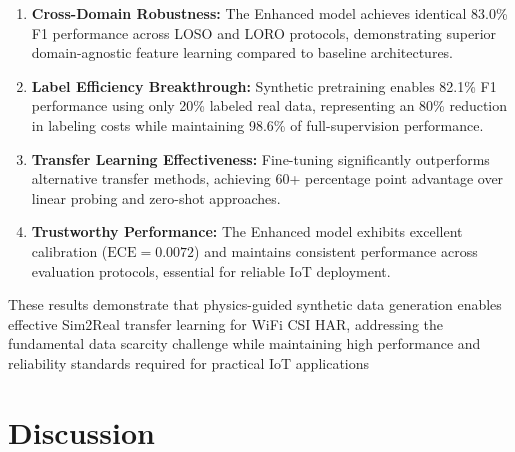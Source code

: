 \documentclass[journal]{IEEEtran}
\begin{document}
\begin{enumerate}
\item \textbf{Cross-Domain Robustness:} The Enhanced model achieves identical 83.0\% F1 performance across LOSO and LORO protocols, demonstrating superior domain-agnostic feature learning compared to baseline architectures.

\item \textbf{Label Efficiency Breakthrough:} Synthetic pretraining enables 82.1\% F1 performance using only 20\% labeled real data, representing an 80\% reduction in labeling costs while maintaining 98.6\% of full-supervision performance.

\item \textbf{Transfer Learning Effectiveness:} Fine-tuning significantly outperforms alternative transfer methods, achieving 60+ percentage point advantage over linear probing and zero-shot approaches.

\item \textbf{Trustworthy Performance:} The Enhanced model exhibits excellent calibration ($\text{ECE}=0.0072$) and maintains consistent performance across evaluation protocols, essential for reliable IoT deployment.
\end{enumerate}

These results demonstrate that physics-guided synthetic data generation enables effective Sim2Real transfer learning for WiFi CSI HAR, addressing the fundamental data scarcity challenge while maintaining high performance and reliability standards required for practical IoT applications

\section{Discussion}
\end{document}
